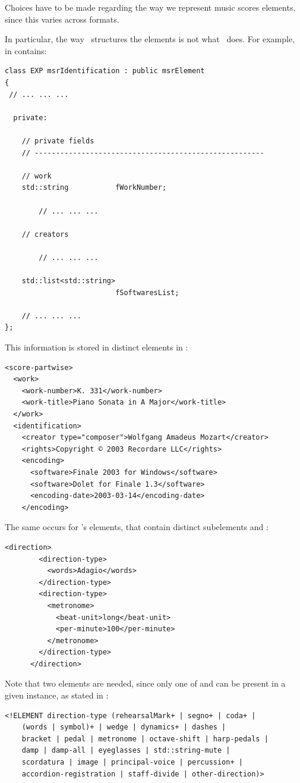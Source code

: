 Choices have to be made regarding the way we represent music scores elements, since this varies across formats.

In particular, the way \mxml\ structures the elements is not what \msrRepr\ does. For example,  in  contains:
\begin{lstlisting}[language=CPlusPlus]
class EXP msrIdentification : public msrElement
{
 // ... ... ...

  private:

    // private fields
    // ------------------------------------------------------

    // work
    std::string           fWorkNumber;

		// ... ... ...

    // creators

		// ... ... ...

    std::list<std::string>
                          fSoftwaresList;

	// ... ... ...
};
\end{lstlisting}

This information is stored in distinct elements in \mxml:
\begin{lstlisting}[language=MusicXML]
<score-partwise>
  <work>
    <work-number>K. 331</work-number>
    <work-title>Piano Sonata in A Major</work-title>
  </work>
  <identification>
    <creator type="composer">Wolfgang Amadeus Mozart</creator>
    <rights>Copyright © 2003 Recordare LLC</rights>
    <encoding>
      <software>Finale 2003 for Windows</software>
      <software>Dolet for Finale 1.3</software>
      <encoding-date>2003-03-14</encoding-date>
    </encoding>
\end{lstlisting}

The same occurs for \mxml's  elements, that contain distinct subelements  and :
\begin{lstlisting}[language=MusicXML]
      <direction>
        <direction-type>
          <words>Adagio</words>
        </direction-type>
        <direction-type>
          <metronome>
            <beat-unit>long</beat-unit>
            <per-minute>100</per-minute>
          </metronome>
        </direction-type>
      </direction>
\end{lstlisting}

Note that two  elements are needed, since only one of  and  can be present in a given instance, as stated in :
\begin{lstlisting}[language=MusicXML]
<!ELEMENT direction-type (rehearsalMark+ | segno+ | coda+ |
	(words | symbol)+ | wedge | dynamics+ | dashes |
	bracket | pedal | metronome | octave-shift | harp-pedals |
	damp | damp-all | eyeglasses | std::string-mute |
	scordatura | image | principal-voice | percussion+ |
	accordion-registration | staff-divide | other-direction)>
\end{lstlisting}

